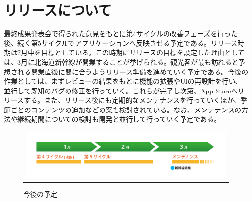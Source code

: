 \section{リリースについて}
最終成果発表会で得られた意見をもとに第4サイクルの改善フェーズを行った後、続く第5サイクルでアプリケーションへ反映させる予定である。リリース時期は2月中を目標としている。この時期にリリースの目標を設定した理由としては、3月に北海道新幹線が開業することが挙げられる。観光客が最も訪れると予想される開業直後に間に合うようリリース準備を進めていく予定である。今後の作業としては、まずレビューの結果をもとに機能の拡張やUIの再設計を行い、並行して既知のバグの修正を行っていく。これらが完了し次第、App Storeへリリースする。また、リリース後にも定期的なメンテナンスを行っていくほか、季節ごとのコンテンツの追加などの案も検討されている。なお、メンテナンスの方法や継続期間についての検討も開発と並行して行っていく予定である。
\begin{figure}[htbp]
  \begin{flushleft}
    \begin{tabular}{c}

      \begin{minipage}{0.7\hsize}
        \begin{center}
\includegraphics[width=15cm, bb=0 0 1478 338]{release-1.png}
       
        \end{center}
      \end{minipage}

    \end{tabular}
    \caption{今後の予定}
    \label{fig:lena}
  \end{flushleft}
\end{figure}
